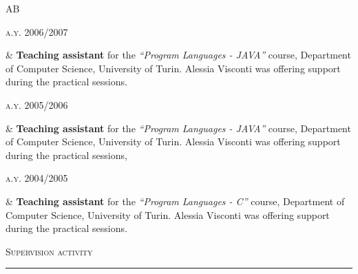 \documentclass[a4paper,10pt]{article}
\newcommand{\mediumtitle}[1]{
	\vspace{0.2cm}
	{\noindent
	\Large \textsc{#1}\\[-2ex]
	\hrule
	\vspace{0.2cm}}
}
\newenvironment{doubletablelist}
{
	\vspace{-0.2cm}
	\begin{longtable}[!h]{AB}}{\end{longtable}
}
\newcommand{\dtlist}[2]{
\hspace{-3cm}
\noindent
	\begin{minipage}{0.22\textwidth}
	\begin{flushright}
	\textsc{#1}
	\end{flushright}
	\end{minipage}
	& #2\\[0.2cm]
}
\begin{document}
\begin{doubletablelist}
	\dtlist{a.y. 2006/2007}{\textbf{Teaching assistant} for the \emph{``Program Languages - JAVA''} course, Department of Computer Science, University of Turin. Alessia Visconti was offering support during the practical sessions. }
	\dtlist{a.y. 2005/2006}{\textbf{Teaching assistant} for the \emph{``Program Languages - JAVA''} course, Department of Computer Science, University of Turin. Alessia Visconti was offering support during the practical sessions,}
	\dtlist{a.y. 2004/2005}{\textbf{Teaching assistant}  for the \emph{``Program Languages - C''} course, Department of Computer Science, University of Turin. Alessia Visconti was offering support during the practical sessions.}
\end{doubletablelist}



\mediumtitle{Supervision activity}

%
\end{document}
